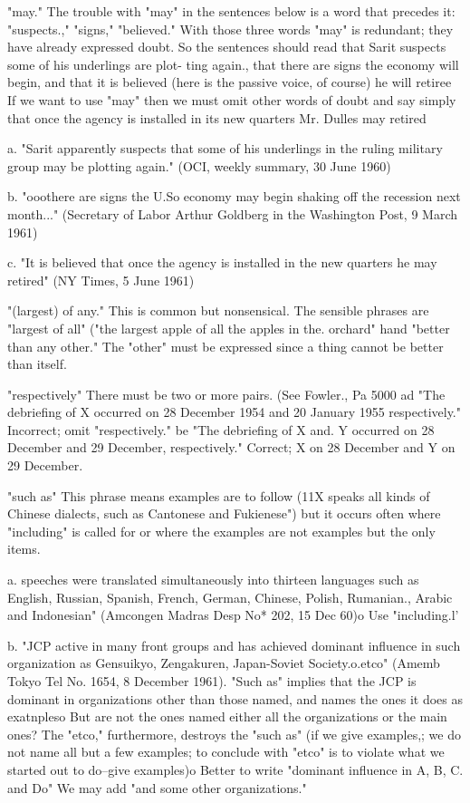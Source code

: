 \documentclass[
    oneside,
    11pt,
    draft
]{memoir}
\begin{document}
"may." The trouble with "may" in the sentences below is a word that precedes it: "suspects.," "signs," "believed." With those three words "may" is redundant; they have already expressed doubt. So the sentences should read that Sarit suspects some of his underlings are plot- ting again., that there are signs the economy will begin, and that it is believed (here is the passive voice, of course) he will retiree If we want to use "may" then we must omit other words of doubt and say simply that once the agency is installed in its new quarters Mr. Dulles may retired 

a. "Sarit apparently suspects that some of his underlings in the ruling military group may be plotting again." (OCI, weekly summary, 30 June 1960) 

b. "ooothere are signs the U.So economy may begin shaking off the recession next month..." (Secretary of Labor Arthur Goldberg in the Washington Post, 9 March 1961) 

c. "It is believed that once the agency is installed in the new quarters he may retired" (NY Times, 5 June 1961) 

"(largest) of any." This is common but nonsensical. The sensible phrases are "largest of all" ("the largest apple of all the apples in the. orchard" hand "better than any other." The "other" must be expressed since a thing cannot be better than itself. 

"respectively" There must be two or more pairs. (See Fowler., Pa 5000 ad "The debriefing of X occurred on 28 December 1954 and 20 January 1955 respectively." Incorrect; omit "respectively." be "The debriefing of X and. Y occurred on 28 December and 29 December, respectively." Correct; X on 28 December and Y on 29 December. 
 
"such as" This phrase means examples are to follow (11X speaks all kinds of Chinese dialects, such as Cantonese and Fukienese") but it occurs often where "including" is called for or where the examples are not examples but the only items. 
 
a. speeches were translated simultaneously into thirteen languages such as English, Russian, Spanish, French, German, Chinese, Polish, Rumanian., Arabic and Indonesian" (Amcongen Madras Desp No* 202, 15 Dec 60)o Use "including.l' 

b. "JCP active in many front groups and has achieved dominant influence in such organization as Gensuikyo, Zengakuren, Japan-Soviet Society.o.etco" (Amemb Tokyo Tel No. 1654, 8 December 1961). "Such as" implies that the JCP is dominant in organizations other than those named, and names the ones it does as exatnpleso But are not the ones named either all the organizations or the main ones? The "etco," furthermore, destroys the "such as" (if we give examples,; we do not name all but a few examples; to conclude with "etco" is to violate what we started out to do--give examples)o Better to write "dominant influence in A, B, C. and Do" We may add "and some other organizations." 
\end{document}
